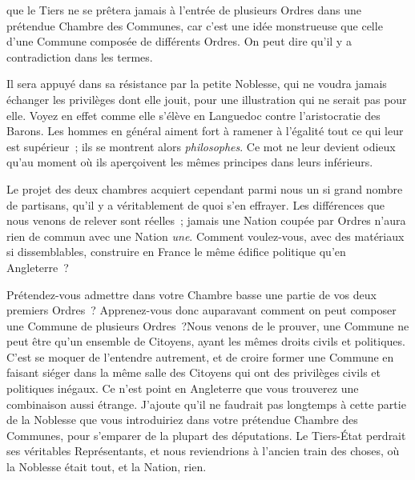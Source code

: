 \documentclass[french,twoside]{book} %
\begin{document}
que le Tiers ne se prêtera jamais à l’entrée de plusieurs Ordres dans une prétendue Chambre des Communes, car c’est une idée monstrueuse que celle d’une Commune composée de différents Ordres. On peut dire qu’il y a contradiction dans les termes.\par
Il sera appuyé dans sa résistance par la petite Noblesse, qui ne voudra jamais échanger les privilèges dont elle jouit, pour une illustration qui ne serait pas pour elle. Voyez en effet comme elle s’élève en Languedoc contre l’aristocratie des Barons. Les hommes en général aiment fort à ramener à l’égalité tout ce qui leur est supérieur ; ils se montrent alors {\itshape philosophes}. Ce mot ne leur devient odieux qu’au moment où ils aperçoivent les mêmes principes dans leurs inférieurs.\par
Le projet des deux chambres acquiert cependant parmi nous un si grand nombre de partisans, qu’il y a véritablement de quoi s’en effrayer. Les différences que nous venons de relever sont réelles ; jamais une Nation coupée par Ordres n’aura rien de commun avec une Nation {\itshape une}. Comment voulez-vous, avec des matériaux si dissemblables, construire en France le même édifice politique qu’en Angleterre ?\par
Prétendez-vous admettre dans votre Chambre basse une partie de vos deux premiers Ordres ? Apprenez-vous donc auparavant comment on peut composer une Commune de plusieurs Ordres ?Nous venons de le prouver, une Commune ne peut être qu’un ensemble de Citoyens, ayant les mêmes droits civils et politiques. C’est se moquer de l’entendre autrement, et de croire former une Commune en faisant siéger dans la même salle des Citoyens qui ont des privilèges civils et politiques inégaux. Ce n’est point en Angleterre que vous trouverez une combinaison aussi étrange. J’ajoute qu’il ne faudrait pas longtemps à cette partie de la Noblesse que vous introduiriez dans votre prétendue Chambre des Communes, pour s’emparer de la plupart des députations. Le Tiers-État perdrait ses véritables Représentants, et nous reviendrions à l’ancien train des choses, où la Noblesse était tout, et la Nation, rien.\par
\end{document}
